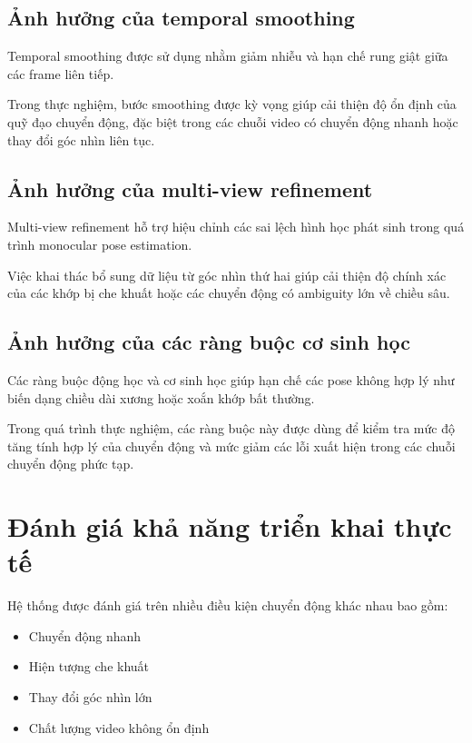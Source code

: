\documentclass[../DoAn.tex]{subfiles}
\begin{document}
\subsection{Ảnh hưởng của temporal smoothing}

Temporal smoothing được sử dụng nhằm giảm nhiễu và hạn chế rung giật giữa các frame liên tiếp.

Trong thực nghiệm, bước smoothing được kỳ vọng giúp cải thiện độ ổn định của quỹ đạo chuyển động, đặc biệt trong các chuỗi video có chuyển động nhanh hoặc thay đổi góc nhìn liên tục.

\subsection{Ảnh hưởng của multi-view refinement}

Multi-view refinement hỗ trợ hiệu chỉnh các sai lệch hình học phát sinh trong quá trình monocular pose estimation.

Việc khai thác bổ sung dữ liệu từ góc nhìn thứ hai giúp cải thiện độ chính xác của các khớp bị che khuất hoặc các chuyển động có ambiguity lớn về chiều sâu.

\subsection{Ảnh hưởng của các ràng buộc cơ sinh học}

Các ràng buộc động học và cơ sinh học giúp hạn chế các pose không hợp lý như biến dạng chiều dài xương hoặc xoắn khớp bất thường.

Trong quá trình thực nghiệm, các ràng buộc này được dùng để kiểm tra mức độ tăng tính hợp lý của chuyển động và mức giảm các lỗi xuất hiện trong các chuỗi chuyển động phức tạp.

\section{Đánh giá khả năng triển khai thực tế}

Hệ thống được đánh giá trên nhiều điều kiện chuyển động khác nhau bao gồm:

\begin{itemize}
    \item Chuyển động nhanh
    \item Hiện tượng che khuất
    \item Thay đổi góc nhìn lớn
    \item Chất lượng video không ổn định
\end{itemize}
\end{document}
